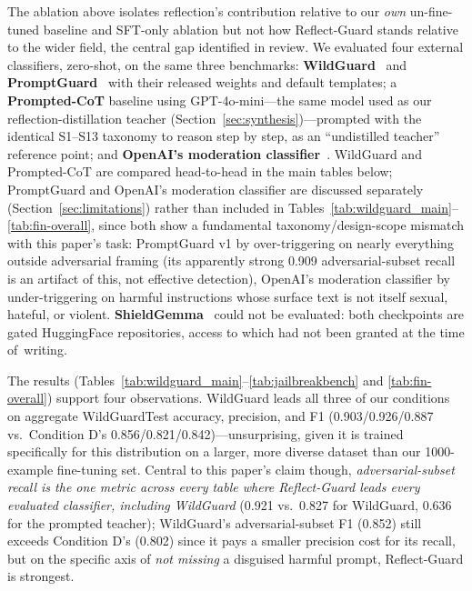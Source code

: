 \documentclass[superintelligence,article,accept,moreauthors]{Definitions/mdpi}
\begin{document}
The ablation above isolates reflection's contribution relative to our \emph{own} un-fine-tuned baseline and SFT-only ablation but not how Reflect-Guard stands relative to the wider field, the central gap identified in review. We evaluated four external classifiers, zero-shot, on the same three benchmarks: \textbf{WildGuard}~\citep{han2024wildguard} and \textbf{PromptGuard}~\citep{meta2024promptguard} with their released weights and default templates; a \textbf{Prompted-CoT} baseline using GPT-4o-mini---the same model used as our reflection-distillation teacher (Section~\ref{sec:synthesis})---prompted with the identical S1--S13 taxonomy to reason step by step, as an ``undistilled teacher'' reference point; and \textbf{OpenAI's moderation classifier}~\citep{markov2023holistic}. WildGuard and Prompted-CoT are compared head-to-head in the main tables below; PromptGuard and OpenAI's moderation classifier are discussed separately (Section~\ref{sec:limitations}) rather than included in Tables~\ref{tab:wildguard_main}--\ref{tab:fin-overall}, since both show a fundamental taxonomy/design-scope mismatch with this paper's task: PromptGuard v1 by over-triggering on nearly everything outside adversarial framing (its apparently strong 0.909 adversarial-subset recall is an artifact of this, not effective detection), OpenAI's moderation classifier by under-triggering on harmful instructions whose surface text is not itself sexual, hateful, or violent. \textbf{ShieldGemma}~\citep{zeng2024shieldgemma} could not be evaluated: both checkpoints are gated HuggingFace repositories, access to which had not been granted at the time \mbox{of writing.}

The results (Tables~\ref{tab:wildguard_main}--\ref{tab:jailbreakbench} and \ref{tab:fin-overall}) support four observations. WildGuard leads all three of our conditions on aggregate WildGuardTest accuracy, precision, and F1 (0.903/0.926/0.887 vs.\ Condition D's 0.856/0.821/0.842)---unsurprising, given it is trained specifically for this distribution on a larger, more diverse dataset than our 1000-example fine-tuning set. Central to this paper's claim though, \emph{adversarial-subset recall is the one metric across every table where Reflect-Guard leads every evaluated classifier, including WildGuard} (0.921 vs.\ 0.827 for WildGuard, 0.636 for the prompted teacher); WildGuard's adversarial-subset F1 (0.852) still exceeds Condition D's (0.802) since it pays a smaller precision cost for its recall, but on the specific axis of \emph{not missing} a disguised harmful prompt, Reflect-Guard is strongest.
\end{document}
